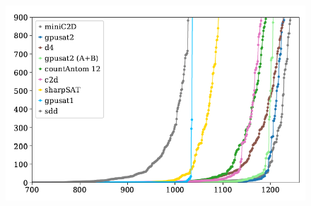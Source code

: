 \documentclass[c,8pt,xcolor...,x11names]{beamer}
\begin{document}
\begin{frame}
\begin{minipage}{0.49\textwidth}
\begin{itemize}
		\end{itemize}
	\end{minipage}
	\begin{minipage}{0.49\textwidth}
		\begin{figure}
			\includegraphics[width=\linewidth]{images/gpusat2Runtime.png}
		\end{figure}
	\end{minipage}

\end{frame}
\end{document}
